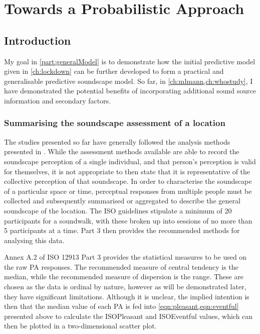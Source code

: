 \chapter{Towards a Probabilistic Approach}
\label{ch:ProbabilisticPOC}

\section{Introduction}

My goal in \cref{part:generalModel} is to demonstrate how the initial predictive model given in \cref{ch:lockdown} can be further developed to form a practical and generalisable predictive soundscape model. So far, in \cref{ch:mlmann,ch:whostudy}, I have demonstrated the potential benefits of incorporating additional sound source information and secondary factors. 

\subsection{Summarising the soundscape assessment of a location}
The studies presented so far have generally followed the analysis methods presented in \citet{ISO12913Part3}. While the assessment methods available are able to record the soundscape perception of a single individual, and that person's perception is valid for themselves, it is not appropriate to then state that it is representative of the collective perception of that soundscape. In order to characterise the soundscape of a particular space or time, perceptual responses from multiple people must be collected and subsequently summarised or aggregated to describe the general soundscape of the location. The ISO guidelines stipulate a minimum of 20 participants for a soundwalk, with these broken up into sessions of no more than 5 participants at a time. Part 3 then provides the recommended methods for analysing this data.

Annex A.2 of ISO 12913 Part 3 provides the statistical measures to be used on the raw PA responses. The recommended measure of central tendency is the median, while the recommended measure of dispersion is the range. These are chosen as the data is ordinal by nature, however as will be demonstrated later, they have significant limitations. Although it is unclear, the implied intention is then that the median value of each PA is fed into \cref{eqn:pleasant,eqn:eventful} presented above to calculate the ISOPleasant and ISOEventful values, which can then be plotted in a two-dimensional scatter plot.

